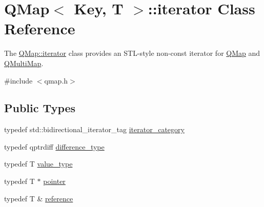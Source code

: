 \hypertarget{class_q_map_1_1iterator}{}\section{Q\+Map$<$ Key, T $>$\+:\+:iterator Class Reference}
\label{class_q_map_1_1iterator}


The \hyperlink{class_q_map_1_1iterator}{Q\+Map\+::iterator} class provides an S\+T\+L-\/style non-\/const iterator for \hyperlink{class_q_map}{Q\+Map} and \hyperlink{class_q_multi_map}{Q\+Multi\+Map}.  




{\ttfamily \#include $<$qmap.\+h$>$}

\subsection*{Public Types}
\begin{DoxyCompactItemize}
\item 
typedef std\+::bidirectional\+\_\+iterator\+\_\+tag \hyperlink{class_q_map_1_1iterator_aade380a34ce9c85a059175d414dbcc92}{iterator\+\_\+category}
\item 
typedef qptrdiff \hyperlink{class_q_map_1_1iterator_afe73281b3461d1635bfdfa5b2e8e7f28}{difference\+\_\+type}
\item 
typedef T \hyperlink{class_q_map_1_1iterator_a7f09aa326409d6d6a02a9a4b4afe3106}{value\+\_\+type}
\item 
typedef T $\ast$ \hyperlink{class_q_map_1_1iterator_ab385357a5b2a2018f1cfa855da8e9285}{pointer}
\item 
typedef T \& \hyperlink{class_q_map_1_1iterator_a51f731d0504f52859c209e708567f0ca}{reference}
\end{DoxyCompactItemize}
